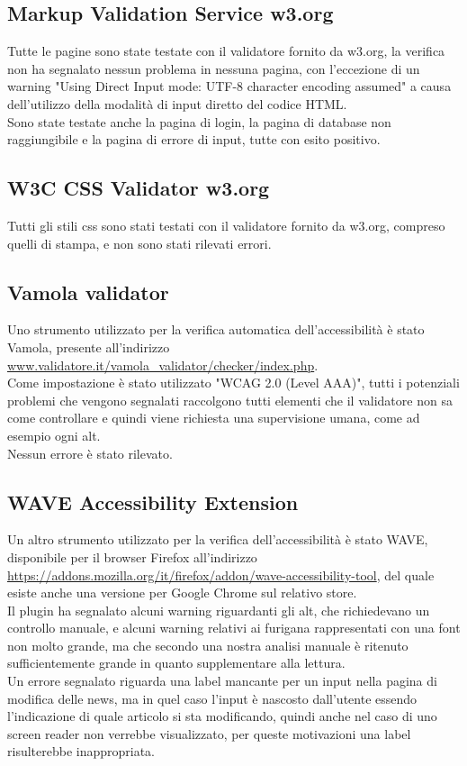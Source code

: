 \documentclass[openany, a4paper, 12pt]{report}
\begin{document}
			\subsection{Markup Validation Service w3.org}
				Tutte le pagine sono state testate con il validatore fornito da w3.org, la verifica non ha segnalato nessun problema in nessuna pagina, con l'eccezione di un warning "Using Direct Input mode: UTF-8 character encoding assumed" a causa dell'utilizzo della modalità di input diretto del codice HTML.\\
				Sono state testate anche la pagina di login, la pagina di database non raggiungibile e la pagina di errore di input, tutte con esito positivo.
			\subsection{W3C CSS Validator w3.org}
				Tutti gli stili css sono stati testati con il validatore fornito da w3.org, compreso quelli di stampa, e non sono stati rilevati errori.
				
			\subsection{Vamola validator}
				Uno strumento utilizzato per la verifica automatica dell'accessibilità è stato Vamola, presente all'indirizzo \url{www.validatore.it/vamola_validator/checker/index.php}.\\
				Come impostazione è stato utilizzato "WCAG 2.0 (Level AAA)", tutti i potenziali problemi che vengono segnalati raccolgono tutti elementi che il validatore non sa come controllare e quindi viene richiesta una supervisione umana, come ad esempio ogni alt.\\
				Nessun errore è stato rilevato.
			\subsection{WAVE Accessibility Extension}
				Un altro strumento utilizzato per la verifica dell'accessibilità è stato WAVE, disponibile per il browser Firefox all'indirizzo \url{https://addons.mozilla.org/it/firefox/addon/wave-accessibility-tool}, del quale esiste anche una versione per Google Chrome sul relativo store.\\
				Il plugin ha segnalato alcuni warning riguardanti gli alt, che richiedevano un controllo manuale, e alcuni warning relativi ai furigana rappresentati con una font non molto grande, ma che secondo una nostra analisi manuale è ritenuto sufficientemente grande in quanto supplementare alla lettura.\\
				Un errore segnalato riguarda una label mancante per un input nella pagina di modifica delle news, ma in quel caso l'input è nascosto dall'utente essendo l'indicazione di quale articolo si sta modificando, quindi anche nel caso di uno screen reader non verrebbe visualizzato, per queste motivazioni una label risulterebbe inappropriata.
\end{document}
